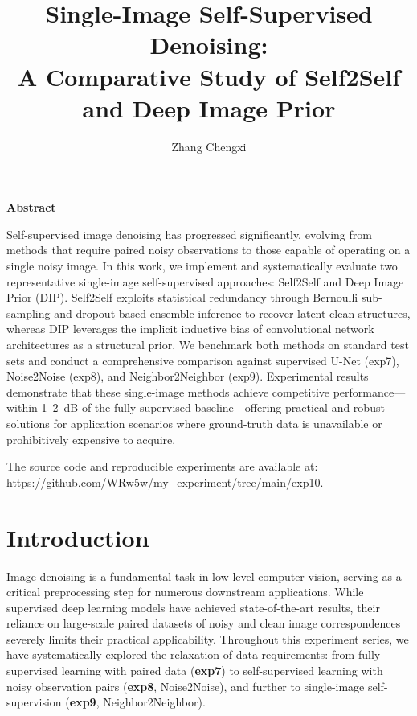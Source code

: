 \documentclass[twocolumn, a4paper, 10pt]{article}
\renewenvironment{abstract}{%
  \begin{center}\normalfont\large\bfseries Abstract\end{center}%
  \itshape\small%
}{}
\begin{document}
\title{\textbf{Single-Image Self-Supervised Denoising:\\A Comparative Study of Self2Self and Deep Image Prior}}
\author{Zhang Chengxi}
\date{}
\maketitle

\begin{abstract}
Self-supervised image denoising has progressed significantly, evolving from methods that require paired noisy observations to those capable of operating on a single noisy image. In this work, we implement and systematically evaluate two representative single-image self-supervised approaches: Self2Self and Deep Image Prior (DIP). Self2Self exploits statistical redundancy through Bernoulli sub-sampling and dropout-based ensemble inference to recover latent clean structures, whereas DIP leverages the implicit inductive bias of convolutional network architectures as a structural prior. We benchmark both methods on standard test sets and conduct a comprehensive comparison against supervised U-Net (exp7), Noise2Noise (exp8), and Neighbor2Neighbor (exp9). Experimental results demonstrate that these single-image methods achieve competitive performance---within 1--2~dB of the fully supervised baseline---offering practical and robust solutions for application scenarios where ground-truth data is unavailable or prohibitively expensive to acquire.

The source code and reproducible experiments are available at: \url{https://github.com/WRw5w/my_experiment/tree/main/exp10}.
\end{abstract}

\section{Introduction}

Image denoising is a fundamental task in low-level computer vision, serving as a critical preprocessing step for numerous downstream applications. While supervised deep learning models have achieved state-of-the-art results, their reliance on large-scale paired datasets of noisy and clean image correspondences severely limits their practical applicability. Throughout this experiment series, we have systematically explored the relaxation of data requirements: from fully supervised learning with paired data (\textbf{exp7}) to self-supervised learning with noisy observation pairs (\textbf{exp8}, Noise2Noise), and further to single-image self-supervision (\textbf{exp9}, Neighbor2Neighbor).
\end{document}
